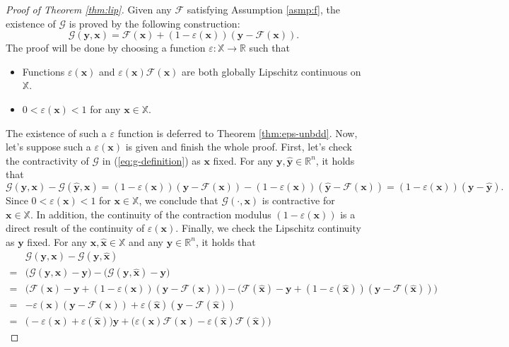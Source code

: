 \documentclass{amsart} %
\def\eqref#1{equation~\ref{#1}}
\def\vx{{\bm{x}}}
\def\vy{{\bm{y}}}
\def\sR{{\mathbb{R}}}
\def\sX{{\mathbb{X}}}
\def\cF{{\mathcal{F}}}
\def\cG{{\mathcal{G}}}
\theoremstyle{definition}
\theoremstyle{remark}
\renewcommand{\eqref}[1]{\textup{(\ref{#1})}}
\begin{document}
\begin{proof}[Proof of Theorem \ref{thm:lip}]
    Given any $\cF$ satisfying Assumption \ref{asmp:f}, the existence of $\cG$ is proved by the following construction:
    \begin{equation}
        \label{eq:g-definition}
        \cG(\vy,\vx) = \cF(\vx) + (1-\varepsilon(\vx)) (\vy - \cF(\vx)).
    \end{equation}
    The proof will be done by choosing a function $\varepsilon: \sX\to\sR$ such that
    \begin{itemize}
        \item Functions $\varepsilon(\vx)$ and $\varepsilon(\vx) \cF(\vx)$ are both globally Lipschitz continuous on $\sX$.
        \item $0 < \varepsilon(\vx) < 1$ for any $\vx \in \sX$.
    \end{itemize}
    The existence of such a $\varepsilon$ function is deferred to Theorem \ref{thm:eps-unbdd}. Now, let's suppose such a $\varepsilon(\vx)$ is given and finish the whole proof. First, let's check the contractivity of $\cG$ in \eqref{eq:g-definition} as $\vx$ fixed. For any $\vy,\hat{\vy}\in\sR^n$, it holds that
    \[  \cG(\vy,\vx) - \cG(\hat{\vy}, \vx)  =  (1-\varepsilon(\vx)) (\vy - \cF(\vx)) - (1-\varepsilon(\vx)) (\hat{\vy} - \cF(\vx)) = (1-\varepsilon(\vx)) (\vy - \hat{\vy}).  \]
    Since $0<\varepsilon(\vx) < 1$ for $\vx \in \sX$, we conclude that $\cG(\cdot,\vx)$ is contractive for $\vx \in \sX$. In addition, the continuity of the contraction modulus $(1-\varepsilon(\vx))$ is a direct result of the continuity of $\varepsilon(\vx)$. 
    Finally, we check the Lipschitz continuity as $\vy$ fixed. For any $\vx,\hat{\vx}\in\sX$ and any $\vy \in \sR^n$, it holds that
    \begin{align*}
            & \cG(\vy,\vx) - \cG(\vy, \hat{\vx})\\
        = & \Big(\cG(\vy,\vx) - \vy\Big) - \Big(\cG(\vy, \hat{\vx}) - \vy\Big) \\
        = & \Big(\cF(\vx) - \vy + (1-\varepsilon(\vx)) (\vy - \cF(\vx)) \Big) - \Big(\cF(\hat{\vx}) - \vy + (1-\varepsilon(\hat{\vx})) (\vy - \cF(\hat{\vx}))\Big) \\
        = & - \varepsilon(\vx) (\vy - \cF(\vx)) + \varepsilon(\hat{\vx}) (\vy - \cF(\hat{\vx}))\\
        = & \Big( - \varepsilon(\vx) + \varepsilon(\hat{\vx}) \Big) \vy + \Big( \varepsilon(\vx)\cF(\vx) - \varepsilon(\hat{\vx}) \cF(\hat{\vx}) \Big)
    \end{align*}

\end{proof}
\end{document}
